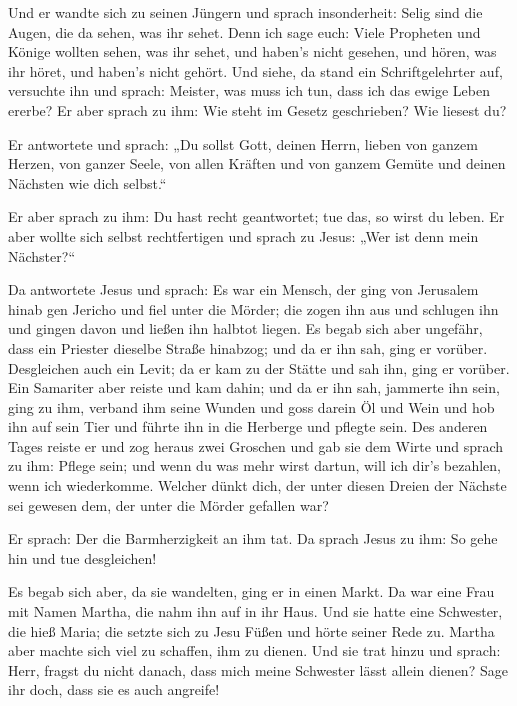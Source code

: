  Und er wandte sich zu seinen Jüngern und sprach
insonderheit: Selig sind die Augen, die da sehen, was ihr sehet.
 Denn ich sage euch: Viele Propheten und Könige wollten
sehen, was ihr sehet, und haben's nicht gesehen, und hören, was ihr
höret, und haben's nicht gehört.  Und siehe, da stand ein
Schriftgelehrter auf, versuchte ihn und sprach: Meister, was muss ich
tun, dass ich das ewige Leben ererbe?  Er aber sprach zu
ihm: Wie steht im Gesetz geschrieben? Wie liesest du?

 Er antwortete und sprach: „Du sollst Gott, deinen Herrn,
lieben von ganzem Herzen, von ganzer Seele, von allen Kräften und von
ganzem Gemüte und deinen Nächsten wie dich selbst.``

 Er aber sprach zu ihm: Du hast recht geantwortet; tue
das, so wirst du leben.  Er aber wollte sich selbst
rechtfertigen und sprach zu Jesus: „Wer ist denn mein Nächster?{}``

 Da antwortete Jesus und sprach: Es war ein Mensch, der
ging von Jerusalem hinab gen Jericho und fiel unter die Mörder; die
zogen ihn aus und schlugen ihn und gingen davon und ließen ihn halbtot
liegen.  Es begab sich aber ungefähr, dass ein Priester
dieselbe Straße hinabzog; und da er ihn sah, ging er vorüber.
 Desgleichen auch ein Levit; da er kam zu der Stätte und
sah ihn, ging er vorüber.  Ein Samariter aber reiste und
kam dahin; und da er ihn sah, jammerte ihn sein,  ging zu
ihm, verband ihm seine Wunden und goss darein Öl und Wein und hob ihn
auf sein Tier und führte ihn in die Herberge und pflegte sein.
 Des anderen Tages reiste er und zog heraus zwei Groschen
und gab sie dem Wirte und sprach zu ihm: Pflege sein; und wenn du was
mehr wirst dartun, will ich dir's bezahlen, wenn ich wiederkomme.
 Welcher dünkt dich, der unter diesen Dreien der Nächste
sei gewesen dem, der unter die Mörder gefallen war?

 Er sprach: Der die Barmherzigkeit an ihm tat. Da sprach
Jesus zu ihm: So gehe hin und tue desgleichen!

 Es begab sich aber, da sie wandelten, ging er in einen
Markt. Da war eine Frau mit Namen Martha, die nahm ihn auf in ihr Haus.
 Und sie hatte eine Schwester, die hieß Maria; die setzte
sich zu Jesu Füßen und hörte seiner Rede zu.  Martha aber
machte sich viel zu schaffen, ihm zu dienen. Und sie trat hinzu und
sprach: Herr, fragst du nicht danach, dass mich meine Schwester lässt
allein dienen? Sage ihr doch, dass sie es auch angreife!

